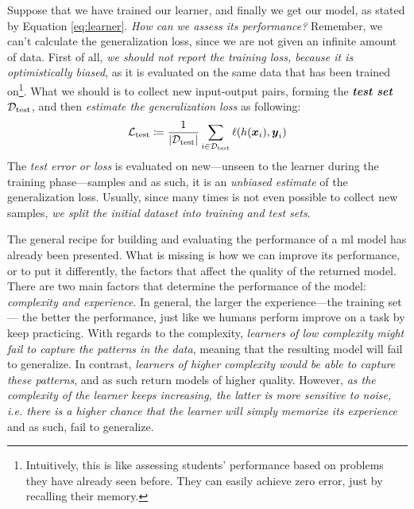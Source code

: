 Suppose that we have trained our learner, and finally we get our model, as
stated by Equation \ref{eq:learner}. \emph{How can we assess its
performance?} Remember, we can't calculate the generalization
loss, since we are not given an infinite amount of
data. First of all, \emph{we should not report the training loss, because it is optimistically biased}, as it
is evaluated on the same data that has been trained on\footnote{Intuitively,
this is like assessing students' performance based on problems they have already
seen before. They can easily achieve zero error, just by recalling their
memory.}. What we should is to collect new input-output pairs, forming the
\emph{\textbf{test set}} $\mathcal{D}_\text{test}$, and then \emph{estimate the
generalization loss} as following:
\begin{equation}
	\label{eq:test_loss}
	\mathcal{L}_\text{test} \coloneqq \frac{1}{\lvert \mathcal{D}_\text{test} \rvert} \sum_{i \in \mathcal{D}_\text{test}}
	\ell(h(\boldsymbol{x}_i), \boldsymbol{y}_i)
\end{equation}
The \emph{test error or loss} is evaluated on
new---unseen to the learner during the training phase---samples and as such, it is an \emph{unbiased estimate} of the generalization loss. Usually, since many times is not even
possible to collect new samples, \emph{we split the initial
dataset into training and test sets}.

The general recipe for building and evaluating the performance of a \gls{ml}
model has already been presented. What is missing is how we can improve its
performance, or to put it differently, the factors that affect the quality of
the returned model. There are two main factors that determine the performance of
the model: \emph{complexity and experience}.
In general, the larger the experience---the training set---
the better the performance, just like we humans perform improve on a task by
keep practicing. With regards to the complexity, \emph{learners of low
complexity might fail to capture the patterns in the
data}, meaning that the resulting model will fail to generalize. In contrast,
\emph{learners of higher complexity would be able to capture these patterns},
and as such return models of higher quality. However, \emph{as the complexity of
the learner keeps increasing, the latter is more sensitive to noise, i.e. there
is a higher chance that the learner will simply memorize its experience} and as
such, fail to generalize.

